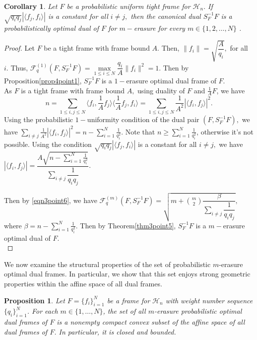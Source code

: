 \documentclass[final,1p,times]{elsarticle}
\newtheorem{prop}[thm]{Proposition}
\newtheorem{cor}[thm]{Corollary}
\begin{document}
\begin{cor}
Let $F$ be a probabilistic uniform tight frame for $\mathcal{H}_n.$  If $\sqrt{q_i q_j}\left| \langle f_j, f_i \rangle \right| $ is a constant for all $i \neq j,$ then the canonical dual $S_{F}^{-1}F$ is a probabilistically optimal dual of $F$ for $m-$erasure for every $m \in \{1,2,\ldots,N\}$ . 
\end{cor}
\begin{proof}
Let $F$ be a tight frame with frame bound $A.$ Then,  $\|f_i\| = \sqrt{\dfrac{A}{q_i}},$ for all $i.$ Thus, $\mathcal{F}^{(1)}_q (F, S_{F}^{-1}F) = \max\limits_{1\leq i \leq N} \dfrac{q_i}{A} \|f_i\|^2 = 1.$ Then  by Proposition\ref{prop4point1}, $S_{F}^{-1}F$ is a $1-$erasure optimal dual frame of $F.$\\
As $F$ is a tight frame with frame bound $A,$ using duality of $F$ and $\frac{1}{A}F$, we have 
$$n=\sum\limits_{1 \leq i,j \leq N}\langle f_i,\frac{1}{A}f_j \rangle \langle \frac{1}{A}f_j,f_i \rangle = \sum\limits_{1 \leq i,j \leq N}\frac{1}{A^2}|\langle f_i,f_j \rangle|^2.$$
Using the probabilistic $1-$uniformity condition of the dual pair $(F,S_{F}^{-1}F),$ we have  $\sum\limits_{i \neq j} \frac{1}{A^2}|\langle f_i,f_j \rangle|^2 = n- \sum\limits_{i=1}^N\frac{1}{q_{i}^2}.$ Note that $n \geq \sum\limits_{i=1}^N\frac{1}{q_{i}^2}$,  otherwise it's not possible. Using the condition  $\sqrt{q_i q_j}\left| \langle f_j, f_i \rangle \right| $ is a constant for all $i \neq j,$ we have $\left|\langle f_i, f_j\rangle\right| = \dfrac{A\sqrt{n- \sum\limits_{i=1}^N\frac{1}{q_{i}^2}}}{\sum\limits_{i\neq j}\dfrac{1}{q_i q_j}}. $



Then by \eqref{eqn3point6}, we have $\mathcal{F}_{q}^{(m)} (F, S_{F}^{-1}F) = \sqrt{m + {{m}\choose{2}}\dfrac{\beta}{\sum\limits_{i\neq j}\dfrac{1}{q_i q_j}}},$ where $\beta = n- \sum\limits_{i=1}^N\frac{1}{q_{i}^2}.$ Then by Theorem\ref{thm3point5}, $ S_{F}^{-1}F$ is a $m-$erasure optimal dual of $F.$\\


\end{proof} 

We now examine the structural properties of the set of probabilistic $m$-erasure optimal dual frames. In particular, we show that this set enjoys strong geometric properties within the affine space of all dual frames. 

\begin{prop}\label{prop:topological-m-optimal}
Let $F=\{f_i\}_{i=1}^N$ be a frame for $\mathcal{H}_n$ with weight number sequence
$\{q_i\}_{i=1}^N$. For each $m\in\{1,\dots,N\}$,  the set of all $m$-erasure probabilistic optimal dual frames of $F$ is a nonempty compact convex subset of the affine space of all dual frames of $F$. In particular, it is closed and bounded.
\end{prop}
\end{document}
